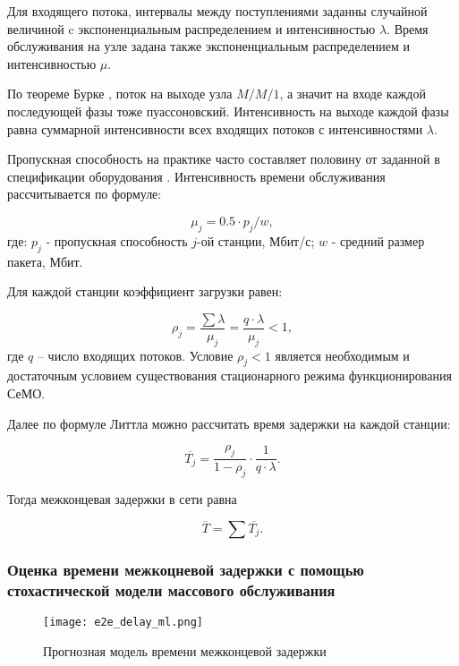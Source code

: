 Для входящего потока, интервалы между поступлениями заданны случайной величиной c экспоненциальным распределением и интенсивностью $\lambda$. Время обслуживания на узле задана также экспоненциальным распределением и интенсивностью $\mu$. 


По теореме Бурке \cite{Burke1956}, поток на выходе узла $M/M/1$, а значит на входе каждой последующей фазы тоже пуассоновский. Интенсивность на выходе каждой фазы равна суммарной интенсивности всех входящих потоков с интенсивностями $\lambda$.

Пропускная способность на практике часто составляет половину от заданной в спецификации оборудования \cite{Proletarsky, Vladimirov2019}. Интенсивность времени обслуживания рассчитывается по формуле: 

\begin{displaymath}
    \mu_j = 0.5 \cdot p_j / w,
\end{displaymath}
где: $p_j$ - пропускная способность $j$-ой станции, Мбит/с; $w$ - средний размер пакета, Мбит.

Для каждой станции коэффициент загрузки равен:


\begin{displaymath}
\rho_j= \frac{\sum{\lambda}}{\mu_j} = \frac{q \cdot \lambda}{\mu_j} <1,
\end{displaymath}
где $q$ -- число входящих потоков. Условие $\rho_j<1$ является необходимым и достаточным условием существования стационарного режима функционирования СеМО.

Далее по формуле Литтла \cite{Little1961} можно рассчитать время задержки на каждой станции:

\begin{displaymath}
    \overline{T_j} = \frac{\rho_j}{1 - \rho_j} \cdot \frac{1}{q \cdot \lambda}.
\end{displaymath}

Тогда межконцевая задержки в сети равна

\begin{equation}
    \label{eq:end_to_end_delay}
    \overline{T}= \sum{\overline{T_j}}.
\end{equation}

\subsubsection{Оценка времени межкоцневой задержки с помощью стохастической модели массового обслуживания}

\begin{figure}[h!]
  \centering
   \texttt{[image: e2e\_delay\_ml.png]}
\caption{Прогнозная модель времени межконцевой задержки}
\label{fig:part1_e2e_delay_ml}
\end{figure}

